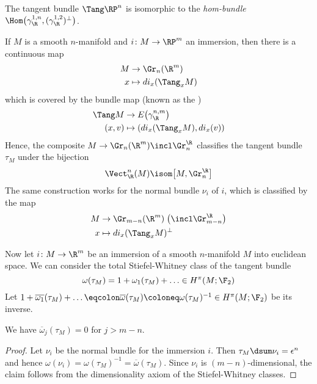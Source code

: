 \begin{corollary}
	The tangent bundle $\Tang \RP^n$ is isomorphic to the \emph{hom-bundle} $\Hom\big(\gamma_\R^{1, n}, (\gamma_\R^{1, 2})^\perp\big)$.
\end{corollary}
\begin{remark}
	If $M$ is a smooth $n$-manifold and $i\colon M \to \RP^m$ an immersion, then there is a continuous map
	\begin{align*}
		M &\to \Gr_n(\R^m) \\
		x &\mapsto d i_x(\Tang_x M)
	\end{align*}
	which is covered by the bundle map (known as the )
	\begin{align*}
		\Tang M &\to E\big(\gamma_\R^{n, m}\big) \\
		(x, v) &\mapsto (d i_x(\Tang_x M), d i_x(v))
	\end{align*}
	Hence, the composite $M \to \Gr_n(\R^m) \incl \Gr_n^\R$ classifies the tangent bundle $\tau_M$ under the bijection
	\begin{equation*}
		\Vect_\R^n(M) \isom \big[M, \Gr_n^\R\big]
	\end{equation*}
	The same construction works for the normal bundle $\nu_i$ of $i$, which is classified by the map
	\begin{align*}
		M &\to \Gr_{m - n}(\R^m)\;\big(\incl \Gr_{m - n}^\R\big) \\
		x &\mapsto d i_x(\Tang_x M)^\perp
	\end{align*}
\end{remark}

Now let $i\colon M \to \R^m$ be an immersion of a smooth $n$-manifold $M$ into euclidean space.
We can consider the total Stiefel-Whitney class of the tangent bundle
\begin{equation*}
	\omega(\tau_M) = 1 + \omega_1(\tau_M) + \ldots \in H^\pi(M; \F_2)
\end{equation*}
Let $1 + \overline{\omega_1}(\tau_M) + \ldots \eqcolon \overline{\omega}(\tau_M) \coloneq \omega(\tau_M)^{-1} \in H^\pi(M; \F_2)$ be its inverse.
\begin{proposition}\label{prop:vanishingomegainverse}
	We have $\overline{\omega}_j(\tau_M) = 0$ for $j > m - n$.
\end{proposition}
\begin{proof}
	Let $\nu_i$ be the normal bundle for the immersion $i$.
	Then $\tau_M \dsum \nu_i = \epsilon^n$ and hence $\omega(\nu_i) = \omega(\tau_M)^{-1} = \overline{\omega}(\tau_M)$.
	Since $\nu_i$ is $(m - n)$-dimensional, the claim follows from the dimensionality axiom of the Stiefel-Whitney classes.
\end{proof}

